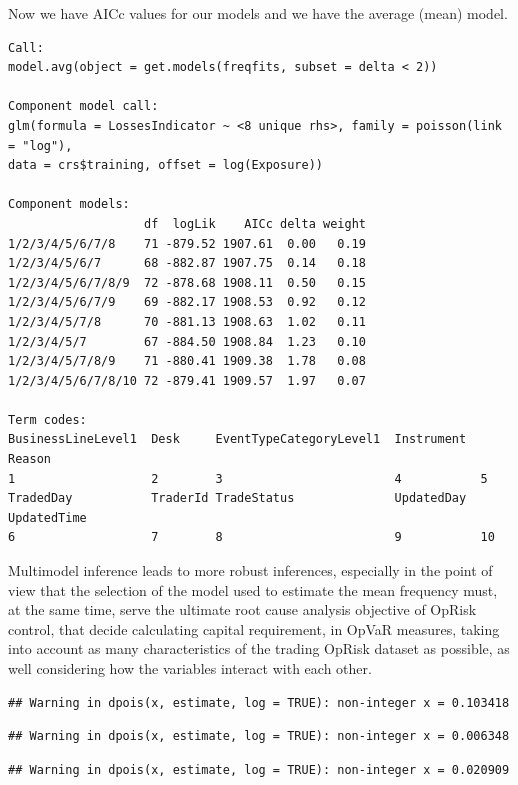 \documentclass[]{article}
\begin{document}
\singlespacing

\doublespacing

Now we have AICc values for our models and we have the average (mean)
model.\medskip

\singlespacing
\begin{verbatim}
Call:
model.avg(object = get.models(freqfits, subset = delta < 2))

Component model call: 
glm(formula = LossesIndicator ~ <8 unique rhs>, family = poisson(link = "log"),
data = crs$training, offset = log(Exposure))

Component models: 
                   df  logLik    AICc delta weight
1/2/3/4/5/6/7/8    71 -879.52 1907.61  0.00   0.19
1/2/3/4/5/6/7      68 -882.87 1907.75  0.14   0.18
1/2/3/4/5/6/7/8/9  72 -878.68 1908.11  0.50   0.15
1/2/3/4/5/6/7/9    69 -882.17 1908.53  0.92   0.12
1/2/3/4/5/7/8      70 -881.13 1908.63  1.02   0.11
1/2/3/4/5/7        67 -884.50 1908.84  1.23   0.10
1/2/3/4/5/7/8/9    71 -880.41 1909.38  1.78   0.08
1/2/3/4/5/6/7/8/10 72 -879.41 1909.57  1.97   0.07

Term codes: 
BusinessLineLevel1  Desk     EventTypeCategoryLevel1  Instrument  Reason 
1                   2        3                        4           5 
TradedDay           TraderId TradeStatus              UpdatedDay  UpdatedTime 
6                   7        8                        9           10 
\end{verbatim}
\doublespacing

Multimodel inference leads to more robust inferences, especially in the
point of view that the selection of the model used to estimate the mean
frequency must, at the same time, serve the ultimate root cause analysis
objective of OpRisk control, that decide calculating capital
requirement, in OpVaR measures, taking into account as many
characteristics of the trading OpRisk dataset as possible, as well
considering how the variables interact with each other.

\begin{verbatim}
## Warning in dpois(x, estimate, log = TRUE): non-integer x = 0.103418
\end{verbatim}

\begin{verbatim}
## Warning in dpois(x, estimate, log = TRUE): non-integer x = 0.006348
\end{verbatim}

\begin{verbatim}
## Warning in dpois(x, estimate, log = TRUE): non-integer x = 0.020909
\end{verbatim}
\end{document}
